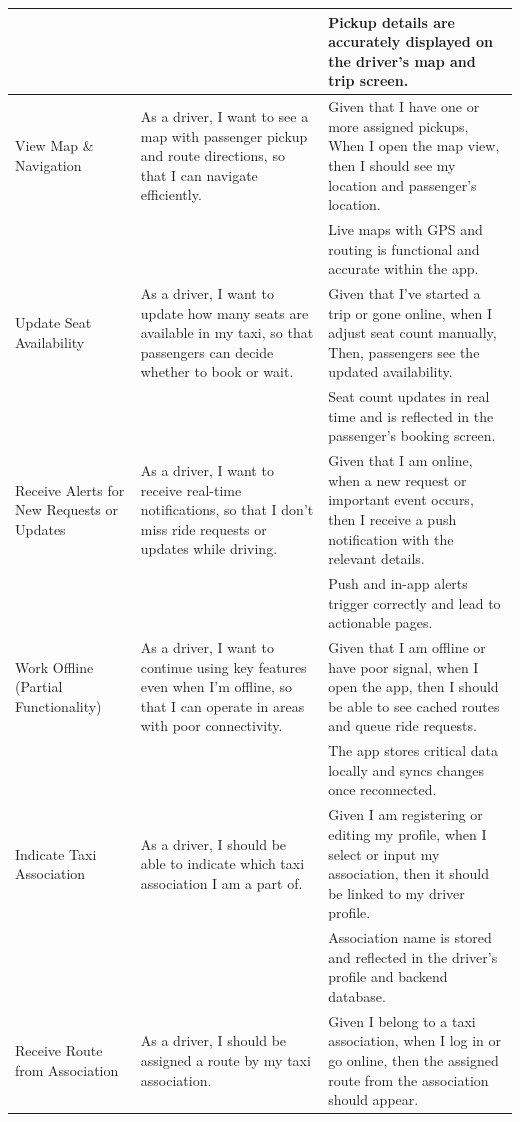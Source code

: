 \documentclass[a4paper,12pt]{article}
\begin{document}
\begin{longtable}{|p{4cm}|p{6cm}|p{5cm}|}
& & Pickup details are accurately displayed on the driver's map and trip screen. \\
\hline
View Map \& Navigation & As a driver, I want to see a map with passenger pickup and route directions, so that I can navigate efficiently. & Given that I have one or more assigned pickups, When I open the map view, then I should see my location and passenger's location. \\
& & Live maps with GPS and routing is functional and accurate within the app. \\
\hline
Update Seat Availability & As a driver, I want to update how many seats are available in my taxi, so that passengers can decide whether to book or wait. & Given that I’ve started a trip or gone online, when I adjust seat count manually, Then, passengers see the updated availability. \\
& & Seat count updates in real time and is reflected in the passenger’s booking screen. \\
\hline
Receive Alerts for New Requests or Updates & As a driver, I want to receive real-time notifications, so that I don’t miss ride requests or updates while driving. & Given that I am online, when a new request or important event occurs, then I receive a push notification with the relevant details. \\
& & Push and in-app alerts trigger correctly and lead to actionable pages. \\
\hline
Work Offline (Partial Functionality) & As a driver, I want to continue using key features even when I’m offline, so that I can operate in areas with poor connectivity. & Given that I am offline or have poor signal, when I open the app, then I should be able to see cached routes and queue ride requests. \\
& & The app stores critical data locally and syncs changes once reconnected. \\
\hline
Indicate Taxi Association & As a driver, I should be able to indicate which taxi association I am a part of. & Given I am registering or editing my profile, when I select or input my association, then it should be linked to my driver profile. \\
& & Association name is stored and reflected in the driver's profile and backend database. \\
\hline
Receive Route from Association & As a driver, I should be assigned a route by my taxi association. & Given I belong to a taxi association, when I log in or go online, then the assigned route from the association should appear. \\

\end{longtable}
\end{document}
